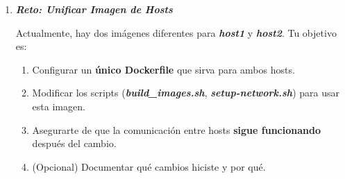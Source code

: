 \documentclass[12pt]{amsart}
\begin{document}
\begin{enumerate}
		\bigskip\bigskip
		
		\item \textbf{\textit{Reto: Unificar Imagen de Hosts }}
		
		\medskip
		\noindent Actualmente, hay dos imágenes diferentes para \textbf{\textit{host1}} y \textbf{\textit{host2}}. Tu objetivo es: 
			
		\medskip
			\begin{enumerate}
				\item Configurar un \textbf{único Dockerfile} que sirva para ambos hosts.
				\smallskip
				\item Modificar los scripts (\textbf{\textit{build\_images.sh}}, \textbf{\textit{setup-network.sh}}) para usar esta imagen.
				\smallskip
				\item Asegurarte de que la comunicación entre hosts \textbf{sigue funcionando} después del cambio.
				\smallskip
				\item (Opcional) Documentar qué cambios hiciste y por qué.
			\end{enumerate}
		
		\bigskip\bigskip

		
	\end{enumerate}
	
\end{document}
